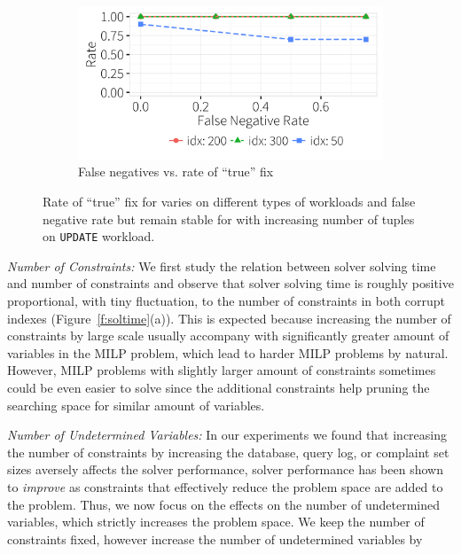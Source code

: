 \begin{figure}[ht]
\begin{subfigure} [t]{.3\textwidth}
    \vspace*{-.1in}
    \label{f:heuristic_acc} 
    \end{subfigure}
    \begin{subfigure} [t]{.3\textwidth}
    \includegraphics[width = .99\columnwidth]{figures/noise_fn_acc_idx}
    \vspace*{-.25in}
    \caption{False negatives vs. rate of ``true'' fix}
    \vspace*{-.1in}
    \label{f:heuristic_time} 
    \end{subfigure}
   \caption{Rate of ``true'' fix for \sys varies on different types of workloads and false negative rate but remain 
   stable for with increasing number of tuples on \texttt{UPDATE} workload.}
   \vspace*{-.1in}
   \label{fig:truerate}
  \end{figure}

\smallskip
\emph{Number of Constraints: } We first study the relation between solver solving time and number of constraints and observe that solver solving time is roughly positive proportional, with tiny fluctuation, to the number of constraints in both corrupt indexes (Figure~\ref{f:soltime}(a)). This is expected because increasing the number of constraints by large scale usually accompany with significantly greater amount of variables in the MILP problem, which lead to harder MILP problems by natural. However, MILP problems with slightly larger amount of constraints sometimes could be even easier to solve since the additional constraints help pruning the searching space for similar amount of variables.

\emph{Number of Undetermined Variables: } In our experiments we found that increasing the number of constraints by increasing the database, query log, or complaint set sizes aversely affects the solver performance,
  solver performance has been shown to \emph{improve} as constraints that effectively reduce the problem space are added to the problem.  
  Thus, we now focus on the effects on the number of undetermined variables, which strictly increases the problem space.
  We keep the number of constraints fixed, however increase the number of undetermined variables by 

